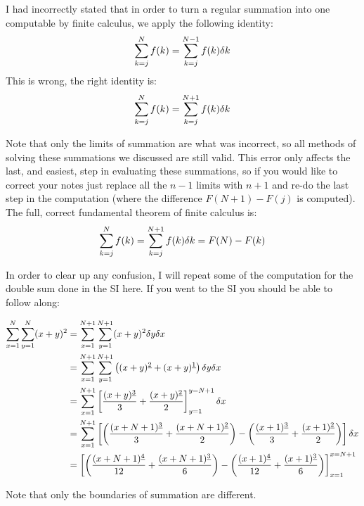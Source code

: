 \documentclass[12pt]{article}
\date{}
\author{}
\title{}
\begin{document}
	I had incorrectly stated that in order to turn a regular summation into one  computable by finite calculus, we apply the following identity:
	\begin{align*}
		\sum_{k=j}^N\limits f(k) =\sum_{k=j}^{N-1}\limits f(k) \delta k 
	\end{align*}
	This is wrong, the right identity is:
	\begin{align*}
			\sum_{k=j}^N\limits f(k) = 	\sum_{k=j}^{N+1}\limits f(k) \delta k
	\end{align*}
	
	Note that only the limits of summation are what was incorrect, so all methods of solving these summations we discussed are still valid. This error only affects the last, and easiest, step in evaluating these summations, so if you would like to correct your notes just replace all the $n-1$ limits with $n+1$ and re-do the last step in the computation (where the difference $F(N+1) - F(j)$ is computed).\\
	
	\indent The full, correct fundamental theorem of finite calculus is:
	\begin{align*}
		\sum_{k = j}^{N}\limits f(k) = \sum_{k=j}^{N+1} f(k)\delta k = F(N) - F(k)
	\end{align*}
	
	In order to clear up any confusion, I will repeat some of the computation for the double sum done in the SI here. If you went to the SI you should be able to follow along:

	\begin{align*}
		\sum_{x=1}^N\limits \sum_{y=1}^N\limits (x+y)^2 &= \sum_{x=1}^{N+1}\limits \sum_{y=1}^{N+1}\limits (x+y)^2 \delta y \delta x\\
		&=\sum_{x=1}^{N+1}\limits \sum_{y=1}^{N+1}\limits\left( (x+y)^{\underline{2}} +(x+y)^{\underline{1}} \right)\delta y \delta x\\
		&=\sum_{x=1}^{N+1}\limits\left[\frac{(x+y)^{\underline{3}}}{3} + \frac{(x+y)^{\underline{2}}}{2}\right]_{y=1}^{y=N+1} \delta x\\
		&= \sum_{x=1}^{N+1}\limits\left[\left( \frac{(x+N+1)^{\underline{3}}}{3} + \frac{(x+N+1)^{\underline{2}}}{2}\right) - \left(\frac{(x+1)^{\underline{3}}}{3} + \frac{(x+1)^{\underline{2}}}{2}\right) \right] \delta x\\
		&= \left[\left( \frac{(x+N+1)^{\underline{4}}}{12} + \frac{(x+N+1)^{\underline{3}}}{6}\right) - \left(\frac{(x+1)^{\underline{4}}}{12} + \frac{(x+1)^{\underline{3}}}{6}\right) \right]_{x=1}^{x=N+1}
	\end{align*}


	Note that only the boundaries of summation are different.
\end{document}
